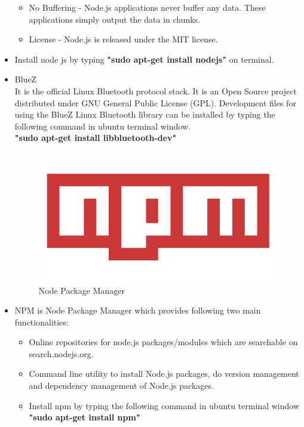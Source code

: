 \documentclass[11pt,a4paper]{article}
\begin{document}
\begin{itemize}
\begin{itemize}
        \item No Buffering - Node.js applications never buffer any data. These applications simply output the data in chunks.

        \item License - Node.js is released under the MIT license.
        	\end{itemize}
	 	
	 \item Install node js by typing \textbf{"sudo apt-get install nodejs"} on terminal.

	 \item BlueZ \\
	 It is the official Linux Bluetooth protocol stack. It is an Open Source project distributed under GNU General Public License (GPL).
	 Development files for using the BlueZ Linux Bluetooth library can be installed by typing the following command in ubuntu terminal window.\\\textbf{ "sudo apt-get install libbluetooth-dev"}
	 \newpage
	 \begin{figure}[h]
    \centering
	\includegraphics[scale=0.3]{npm-logo.png}
	\caption{Node Package Manager}
	\end{figure}
	
	\item NPM is Node Package Manager which provides following two main functionalities:
	\begin{itemize}
	\item  Online repositories for node.js packages/modules which are searchable on search.nodejs.org.
	\item  Command line utility to install Node.js packages, do version management and dependency management of Node.js packages.
	\item Install npm by typing the following command in ubuntu terminal window \textbf{"sudo apt-get install npm"}
	\end{itemize}
	

\end{itemize}
\end{document}

